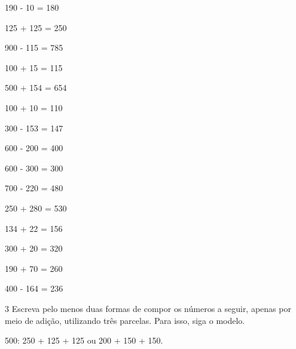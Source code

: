 \begin{minipage}{.5\textwidth}
\begin{escolha}[itemsep=-5pt]
\item 190 - 10 = 180

\item 125 + 125 = 250

\item 900 - 115 = 785

\item 100 + 15 = 115

\item 500 + 154 = 654

\item 100 + 10 = 110

\item 300 - 153 = 147

\item 600 - 200 = 400

\item 600 - 300 = 300

\item 700 - 220 = 480

\item 250 + 280 = 530

\item 134 + 22 = 156

\item 300 + 20 = 320

\item 190 + 70 = 260

\item 400 - 164 = 236
\end{escolha}
\end{minipage}

\num{3} Escreva pelo menos duas formas de compor os números a seguir, apenas por meio de adição, utilizando três parcelas. Para isso, siga o modelo.


\begin{mdframed}[linewidth=2pt,linecolor=azul!20,backgroundcolor=azul!20,roundcorner=2pt]
500: 250 + 125 + 125 ou 200 + 150 + 150.
\end{mdframed}

